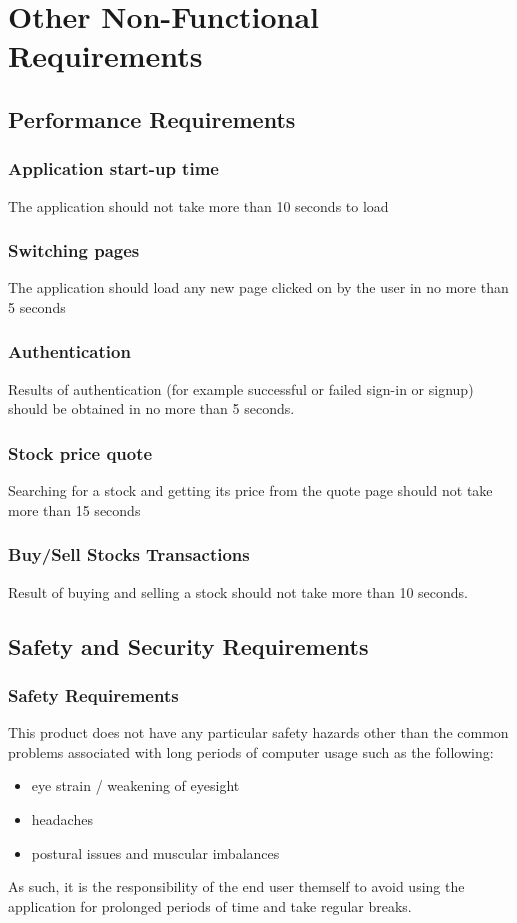 \documentclass[12 pt, a4paper]{report}
\begin{document}
	
	\chapter {Other Non-Functional Requirements}
	\section {Performance Requirements}

	\subsection{Application start-up time}
	The application should not take more than 10 seconds to load
	\subsection{Switching pages}
	The application should load any new page clicked on by the user in no more than 5 seconds
	\subsection{Authentication}
	Results of authentication (for example successful or failed sign-in or signup) should be obtained in no more than 5 seconds.
	\subsection{Stock price quote}
	Searching for a stock and getting its price from the quote page should not take more than 15 seconds
	\subsection{Buy/Sell Stocks Transactions}
	Result of buying and selling a stock should not take more than 10 seconds.
	
	
	\section {Safety and Security Requirements}
	\subsection{Safety Requirements}
	This product does not have any particular safety hazards other than the common problems associated with long periods of computer usage such as the following:
	\begin{itemize}
		\item eye strain / weakening of eyesight
		\item headaches
		\item postural issues and muscular imbalances
	\end{itemize}
	As such, it is the responsibility of the end user themself to avoid using the application for prolonged periods of time and take regular breaks.
	
\end{document}

